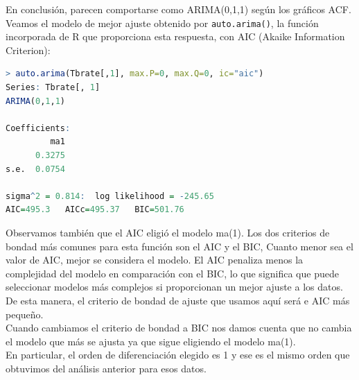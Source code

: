 \documentclass[a4paper,]{article}
\begin{document}
En conclusión, parecen comportarse como ARIMA(0,1,1) según los gráficos ACF.\\

\bigskip
Veamos el modelo de mejor ajuste obtenido por \texttt{auto.arima()}, la función incorporada de R que proporciona esta respuesta, con AIC (Akaike Information Criterion): \\

\begin{lstlisting}[language=R]
> auto.arima(Tbrate[,1], max.P=0, max.Q=0, ic="aic")
Series: Tbrate[, 1] 
ARIMA(0,1,1) 

Coefficients:
         ma1
      0.3275
s.e.  0.0754

sigma^2 = 0.814:  log likelihood = -245.65
AIC=495.3   AICc=495.37   BIC=501.76
\end{lstlisting}

Observamos también que el AIC eligió el modelo ma(1). Los dos criterios de bondad más comunes para esta función son el AIC y el BIC,  Cuanto menor sea el valor de AIC, mejor se considera el modelo. El AIC penaliza menos la complejidad del modelo en comparación con el BIC, lo que significa que puede seleccionar modelos más complejos si proporcionan un mejor ajuste a los datos. De esta manera, el criterio de bondad de ajuste que usamos aquí será e AIC más pequeño.\\

Cuando cambiamos el criterio de bondad a BIC
nos damos cuenta que no cambia el modelo que más se ajusta ya que sigue eligiendo el modelo ma(1).\\

En particular, el orden de diferenciación elegido es 1 y ese es el mismo orden que obtuvimos del análisis anterior para esos datos. \\
\end{document}
